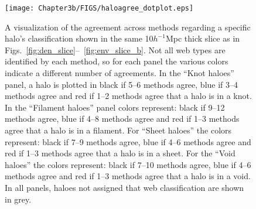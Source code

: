 \begin{figure}
 \texttt{[image: Chapter3b/FIGS/haloagree\_dotplot.eps]}
 \vspace{-.4cm}
 \caption{A visualization of the agreement across methods regarding a specific halo's classification shown in the same 10$h^{-1}$Mpc thick slice as in Figs.~\ref{fig:den_slice}--~\ref{fig:env_slice_b}. Not all web types are identified by each method, so for each panel the various colors indicate a different number of agreements. In the ``Knot haloes'' panel, a halo is plotted in black if 5--6 methods agree, blue if 3--4 methods agree and red if 1--2 methods agree that a halo is in a knot. In the ``Filament haloes'' panel colors represent: black if 9--12 methods agree, blue if 4--8 methods agree and red if 1--3 methods agree that a halo is in a filament. For ``Sheet haloes'' the colors represent: black if 7--9 methods agree, blue if 4--6 methods agree and red if 1--3 methods agree that a halo is in a sheet. For the ``Void haloes'' the colors represent: black if 7--10 methods agree, blue if 4--6 methods agree and red if 1--3 methods agree that a halo is in a void. In all panels, haloes not assigned that web classification are shown in grey. }
  \label{fig:halo_agree_dot}
\end{figure}


